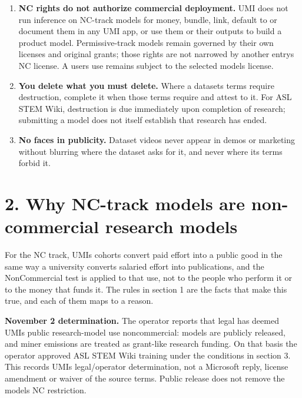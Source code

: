 \documentclass[10pt,a4paper]{article}
\begin{document}
\begin{enumerate}
  license is a condition of the award; on the NC track that means CC
  BY-NC-SA 4.0.
\item
  \textbf{NC rights do not authorize commercial deployment.} UMI does
  not run inference on NC-track models for money, bundle, link, default
  to or document them in any UMI app, or use them or their outputs to
  build a product model. Permissive-track models remain governed by
  their own licenses and original grants; those rights are not narrowed
  by another entry\textquotesingle s NC license. A
  user\textquotesingle s use remains subject to the selected
  model\textquotesingle s license.
\item
  \textbf{You delete what you must delete.} Where a
  dataset\textquotesingle s terms require destruction, complete it when
  those terms require and attest to it. For ASL STEM Wiki, destruction
  is due immediately upon completion of research; submitting a model
  does not itself establish that research has ended.
\item
  \textbf{No faces in publicity.} Dataset videos never appear in demos
  or marketing without blurring where the dataset asks for it, and never
  where its terms forbid it.
\end{enumerate}

\section{2. Why NC-track models are non-commercial research
models}\label{2-why-nc-track-models-are-non-commercial-research-models}

For the NC track, UMI\textquotesingle s cohorts convert paid effort into
a public good in the same way a university converts salaried effort into
publications, and the NonCommercial test is applied to that use, not to
the people who perform it or to the money that funds it. The rules in
section 1 are the facts that make this true, and each of them maps to a
reason.

\textbf{November 2 determination.} The operator reports that legal has
deemed UMI\textquotesingle s public research-model use noncommercial:
models are publicly released, and miner emissions are treated as
grant-like research funding. On that basis the operator approved ASL
STEM Wiki training under the conditions in section 3. This records
UMI\textquotesingle s legal/operator determination, not a Microsoft
reply, license amendment or waiver of the source terms. Public release
does not remove the model\textquotesingle s NC restriction.
\end{document}
